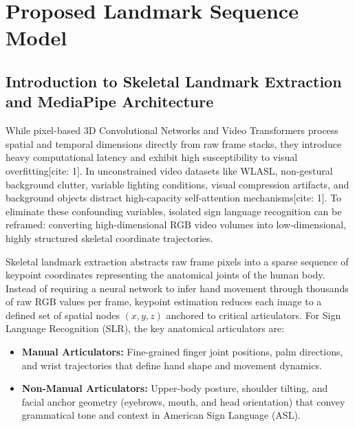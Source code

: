\documentclass[12pt,a4paper]{article}
\begin{document}
\section{Proposed Landmark Sequence Model}

\subsection{Introduction to Skeletal Landmark Extraction and MediaPipe Architecture}

While pixel-based 3D Convolutional Networks and Video Transformers process spatial and temporal dimensions directly from raw frame stacks, they introduce heavy computational latency and exhibit high susceptibility to visual overfitting[cite: 1]. In unconstrained video datasets like WLASL, non-gestural background clutter, variable lighting conditions, visual compression artifacts, and background objects distract high-capacity self-attention mechanisms[cite: 1]. To eliminate these confounding variables, isolated sign language recognition can be reframed: converting high-dimensional RGB video volumes into low-dimensional, highly structured skeletal coordinate trajectories.

Skeletal landmark extraction abstracts raw frame pixels into a sparse sequence of keypoint coordinates representing the anatomical joints of the human body. Instead of requiring a neural network to infer hand movement through thousands of raw RGB values per frame, keypoint estimation reduces each image to a defined set of spatial nodes $(x, y, z)$ anchored to critical articulators. For Sign Language Recognition (SLR), the key anatomical articulators are:
\begin{itemize}
    \item \textbf{Manual Articulators:} Fine-grained finger joint positions, palm directions, and wrist trajectories that define hand shape and movement dynamics.
    \item \textbf{Non-Manual Articulators:} Upper-body posture, shoulder tilting, and facial anchor geometry (eyebrows, mouth, and head orientation) that convey grammatical tone and context in American Sign Language (ASL).
\end{itemize}
\end{document}
